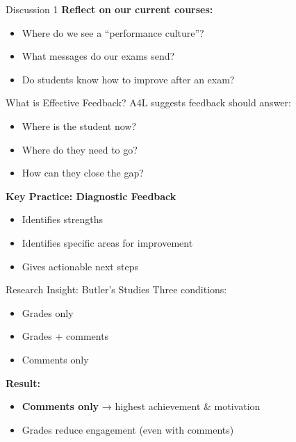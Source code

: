 \documentclass[dvipsnames]{beamer}
\begin{document}

\begin{frame}{Discussion 1}
\textbf{Reflect on our current courses:}
\begin{itemize}
\item Where do we see a “performance culture”?
\item What messages do our exams send?
\item Do students know how to improve after an exam?
\end{itemize}
\end{frame}


\begin{frame}{What is Effective Feedback?}
A4L suggests feedback should answer:
\begin{itemize}
\item Where is the student now?
\item Where do they need to go?
\item How can they close the gap?
\end{itemize}

\vspace{1em}

\textbf{Key Practice: Diagnostic Feedback}
\begin{itemize}
\item Identifies strengths
\item Identifies specific areas for improvement
\item Gives actionable next steps
\end{itemize}
\end{frame}


\begin{frame}{Research Insight: Butler’s Studies}
Three conditions:
\begin{itemize}
\item Grades only
\item Grades + comments
\item Comments only
\end{itemize}

\vspace{1em}

\textbf{Result:}
\begin{itemize}
\item \textbf{Comments only} → highest achievement & motivation
\item Grades reduce engagement (even with comments)
\end{itemize}
\end{frame}
\end{document}
